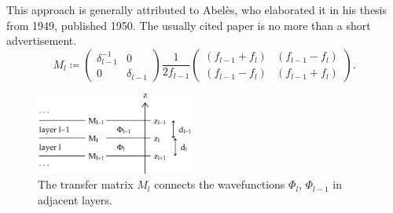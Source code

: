 {This approach is generally attributed to Abelès,
who elaborated it in his thesis from 1949, published 1950.
The usually cited paper \cite{Abe50a} is no more than a short advertisement.}
\begin{equation}\label{EMil}
  M_l
   \coloneqq
   \left(\begin{array}{cc}
     \delta_{l-1}^{-1}&0\\
       0 & \delta_{l-1}
   \end{array}\right)
   \frac{1}{2f_{l-1}}
   \left(\begin{array}{cc}
       (f_{l-1}+f_l)&(f_{l-1}-f_l)\\
       (f_{l-1}-f_l)&(f_{l-1}+f_l)
   \end{array}\right).
\end{equation}

\begin{figure}[tb]
\begin{center}
\includegraphics[width=0.46\textwidth]{fig/drawing/multilayer_boundary.ps}
\end{center}
\caption{The transfer matrix $M_l$ connects the wavefunctions
%
%
%
$\Phi_l$, $\Phi_{l-1}$ in adjacent layers.}
\label{Fboundary}
\end{figure}

